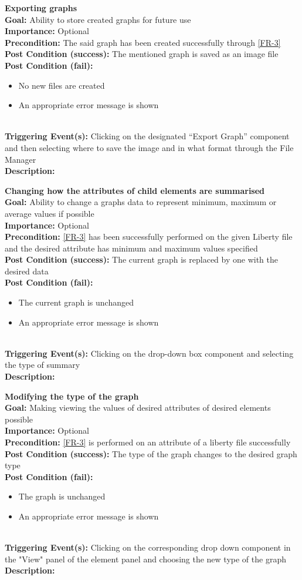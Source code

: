 \documentclass[10pt,a4paper]{report}
\newcommand{\precondition}[1]{
    \textbf{Precondition: } #1 \leavevmode \\
}
\newcommand{\FRODescription}[8]{
    \textbf{#1} \leavevmode \\
    \textbf{Goal: } #2 \leavevmode \\
    \textbf{Importance: } #3 \leavevmode \\
    \precondition{#4}
    \textbf{Post Condition (success): } #5 \leavevmode \\
    \textbf{Post Condition (fail): } #6 \leavevmode \\
    \textbf{Triggering Event(s): } #7 \leavevmode \\
    \textbf{Description: } \leavevmode \\
    #8}
\begin{document}
\begin{FRO}
    \item \FRODescription{Exporting graphs}
    {Ability to store created graphs for future use}
    {Optional}
    {The said graph has been created successfully through \ref{FR-3}}
    {The mentioned graph is saved as an image file}
    {\begin{itemize}
        \item No new files are created
        \item An appropriate error message is shown
    \end{itemize}}
    {Clicking on the designated “Export Graph” component and then selecting where to save the image and in what format through the File Manager}
    \item \FRODescription{Changing how the attributes of child elements are summarised}
    {Ability to change a graphs data to represent minimum, maximum or average values if possible}
    {Optional}
    {\ref{FR-3} has been successfully performed on the given Liberty file and the desired attribute has minimum and maximum values specified}
    {The current graph is replaced by one with the desired data}
    {\begin{itemize}
        \item The current graph is unchanged
        \item An appropriate error message is shown
    \end{itemize}}
    {Clicking on the drop-down box component and selecting the type of summary}
    \item \FRODescription{Modifying the type of the graph}
    {Making viewing the values of desired attributes of desired elements possible}
    {Optional}
    {\ref{FR-3} is performed on an attribute of a liberty file successfully}
    {The type of the graph changes to the desired graph type}
    {\begin{itemize}
        \item The graph is unchanged
        \item An appropriate error message is shown
    \end{itemize}}
    {Clicking on the corresponding drop down component in the "View" panel of the element panel and choosing the new type of the graph}

\end{FRO}
\end{document}
